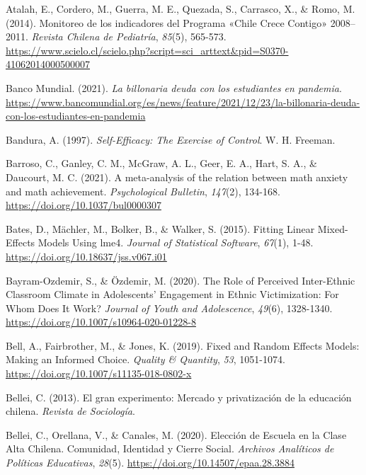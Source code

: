 \documentclass[
  spanish,
  a4paper,
  oneside]{scrbook}
\newlength{\cslhangindent}
\newenvironment{CSLReferences}[2] %
 {\begin{list}{}{%
  \setlength{\itemindent}{0pt}
  \setlength{\leftmargin}{0pt}
  \setlength{\parsep}{0pt}
  \ifodd #1
   \setlength{\leftmargin}{\cslhangindent}
   \setlength{\itemindent}{-1\cslhangindent}
  \fi
  \setlength{\itemsep}{#2\baselineskip}}}
 {\end{list}}
\begin{document}
\begin{CSLReferences}{1}{0}
Atalah, E., Cordero, M., Guerra, M. E., Quezada, S., Carrasco, X., \&
Romo, M. (2014). Monitoreo de los indicadores del Programa {«Chile Crece
Contigo»} 2008--2011. \emph{Revista Chilena de Pediatría}, \emph{85}(5),
565-573.
\url{https://www.scielo.cl/scielo.php?script=sci_arttext&pid=S0370-41062014000500007}

Banco Mundial. (2021). \emph{La billonaria deuda con los estudiantes en
pandemia}.
\url{https://www.bancomundial.org/es/news/feature/2021/12/23/la-billonaria-deuda-con-los-estudiantes-en-pandemia}

Bandura, A. (1997). \emph{Self-Efficacy: The Exercise of Control}. W. H.
Freeman.

Barroso, C., Ganley, C. M., McGraw, A. L., Geer, E. A., Hart, S. A., \&
Daucourt, M. C. (2021). A meta-analysis of the relation between math
anxiety and math achievement. \emph{Psychological Bulletin},
\emph{147}(2), 134-168. \url{https://doi.org/10.1037/bul0000307}

Bates, D., Mächler, M., Bolker, B., \& Walker, S. (2015). Fitting Linear
Mixed-Effects Models Using {lme4}. \emph{Journal of Statistical
Software}, \emph{67}(1), 1-48.
\url{https://doi.org/10.18637/jss.v067.i01}

Bayram-Ozdemir, S., \& Özdemir, M. (2020). The Role of Perceived
Inter-Ethnic Classroom Climate in Adolescents' Engagement in Ethnic
Victimization: For Whom Does It Work? \emph{Journal of Youth and
Adolescence}, \emph{49}(6), 1328-1340.
\url{https://doi.org/10.1007/s10964-020-01228-8}

Bell, A., Fairbrother, M., \& Jones, K. (2019). Fixed and Random Effects
Models: Making an Informed Choice. \emph{Quality \& Quantity},
\emph{53}, 1051-1074. \url{https://doi.org/10.1007/s11135-018-0802-x}

Bellei, C. (2013). El gran experimento: Mercado y privatizaci{ó}n de la
educaci{ó}n chilena. \emph{Revista de Sociolog{í}a}.

Bellei, C., Orellana, V., \& Canales, M. (2020). Elección de Escuela en
la Clase Alta Chilena. Comunidad, Identidad y Cierre Social.
\emph{Archivos Analíticos de Políticas Educativas}, \emph{28}(5).
\url{https://doi.org/10.14507/epaa.28.3884}


\end{CSLReferences}
\end{document}
